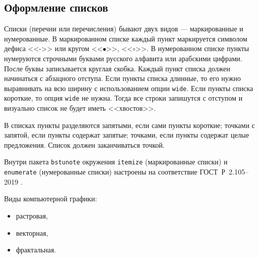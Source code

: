 \documentclass[14pt]{extarticle}
\begin{document}
\subsection{Оформление списков}
Списки (перечни или перечисления) бывают двух видов --- маркированные и нумерованные. В маркированном списке каждый пункт маркируется символом дефиса <<->> или кругом <<$\bullet$>>, <<$\circ$>>. В нумерованном списке пункты нумеруются строчными буквами русского алфавита или арабскими цифрами. После буквы записывается круглая скобка.
Каждый пункт списка должен начинаться с абзацного отступа. Если пункты списка длинные, то его нужно выравнивать на всю ширину с использованием опции \texttt{wide}. Если пункты списка короткие, то опция  \texttt{wide} не нужна. Тогда все строки запишутся с отступом и визуально список не будет иметь <<хвостов>>.

В списках пункты разделяются запятыми, если сами пункты короткие; точками с запятой, если пункты содержат запятые; точками, если пункты содержат целые предложения. 
Список должен заканчиваться точкой.

Внутри пакета \texttt{bstunote} окружения \texttt{itemize} (маркированные списки) и \linebreak \texttt{enumerate} (нумерованные списки) настроены на соответствие ГОСТ~Р~2.105--2019 \cite[раздел 6.7]{gost2105}.

\begin{tcolorbox}[title={Пример маркированного списка}, before upper={\setlength{\parindent}{1.25cm}}]
\par Виды компьютерной графики:
\begin{itemize}
	\item растровая,
	\item векторная,
	\item фрактальная.
\end{itemize}
\end{tcolorbox}
\end{document}
